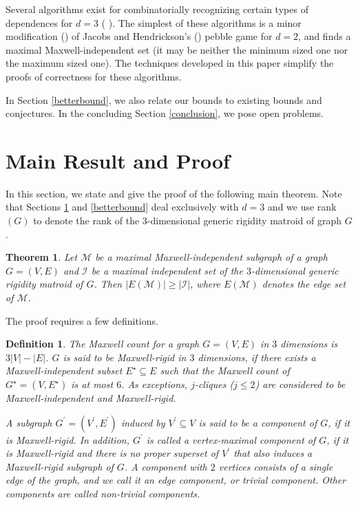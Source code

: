 \documentclass[10pt]{article}
\def\M{\mathcal {M}}
\def\I{\mathcal {I}}
\newtheorem{thm}{Theorem}
\newtheorem{dfn}{Definition}
\begin{document}
Several algorithms exist for combinatorially recognizing certain types of dependences for $d=3$  (\cite{bib:survey, andrewThesis,sitharam:zhou:tractableADG:2004}
). The simplest of these algorithms is a
minor modification (\cite{andrewThesis}) of Jacobs and Hendrickson's (\cite{Jacobs97analgorithm}) pebble game for $d=2$, and finds a maximal Maxwell-independent set (it may be neither the minimum sized one nor the 
maximum sized one). The techniques developed in this paper simplify the proofs of correctness for these algorithms.

\medskip

\medskip\noindent
In Section \ref{betterbound}, we also relate our bounds to existing bounds and conjectures.
In the concluding Section \ref{conclusion}, we pose open problems.






\section{Main Result and Proof}\label{sec:main}
In this section, we state and give the proof of the following main theorem. Note that Sections \ref{sec:main} and \ref{betterbound} deal exclusively with $d=3$ and we use rank$(G)$ to denote the rank of the $3$-dimensional generic rigidity matroid of graph $G$.


\begin{thm}\label{thm:main}
Let $\M$ be a maximal Maxwell-independent subgraph of a graph $G=(V,
E)$ and $\I$ be a maximal independent set of the $3$-dimensional generic
rigidity matroid of $G$. Then $|E(\M)| \ge |\I|$, where $E(\M)$ denotes the edge set of $\M$.
\end{thm}

\medskip
\noindent The proof requires a few definitions.


\begin{dfn}\label{dfn:Maxwell}
The {\em Maxwell count} for a graph $G=(V, E)$ in $3$ dimensions is $3|V|-|E|$. $G$ is said to be \emph{Maxwell-rigid} in $3$ dimensions, if there exists a Maxwell-independent subset $E^\star \subseteq E$ such that
the Maxwell count of $G^\star=(V, E^\star)$ is at most $6$. As exceptions, $j$-cliques  ($j\leq 2$) are considered to be Maxwell-independent and Maxwell-rigid.

A subgraph $G^\prime = (V^\prime,E^\prime)$ induced by $V^\prime \subseteq V$ is
said to be a {\em component} of $G$, if it is Maxwell-rigid. In addition, $G^\prime$ is called a {\em vertex-maximal component} of $G$, if it is Maxwell-rigid and there is no proper superset of $V^\prime$ that also induces a Maxwell-rigid subgraph of $G$. A component with $2$ vertices consists of a single edge of the graph, and we call it an {\em edge component}, or {\em trivial} component. Other components are called {\em non-trivial} components.
\end{dfn}
\end{document}
